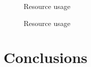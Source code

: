 \documentclass[]{report}
\begin{document}
 \begin{figure}[!htb]
	\caption{\label{fig:my-label} Resource usage}
\end{figure}
\begin{figure}[!htb]
	\caption{\label{fig:my-label} Resource usage}
\end{figure}
\clearpage

\chapter{Conclusions}

\printbibliography
\end{document}
